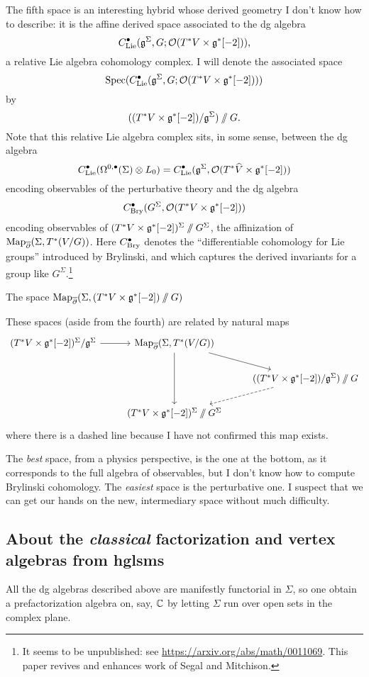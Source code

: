 \documentclass[11pt]{amsart}
\newcommand{\clie}{C^\bu_{\rm Lie}}
\newcommand{\cbry}{C^\bu_{\rm Bry}}
\begin{document}
The fifth space is an interesting hybrid whose derived geometry I don't know how to describe:
it is the affine derived space associated to the dg algebra
\[
\clie(\fg^\Sigma, G; \cO(T^* V \times \fg^*[-2])),
\]
a relative Lie algebra cohomology complex. 
I will denote the associated space
\[
\Spec(\clie(\fg^\Sigma, G; \cO(T^* V \times \fg^*[-2])))
\]
by
\[
((T^* V \times \mathfrak g^*[-2])/\mathfrak g^\Sigma)\mathbin{/\mkern-6mu/} G.
\]
Note that this relative Lie algebra complex sits, in some sense, between the dg algebra
\[
\clie(\Omega^{0,\bu}(\Sigma) \otimes L_0) = \clie(\fg^\Sigma, \cO(T^*\widehat{V} \times \fg^*[-2]))
\]
encoding observables of the perturbative theory
and the dg algebra
\[
\cbry(G^\Sigma, \cO(T^* V \times \fg^*[-2]))
\]
encoding observables of $(T^*V \times \mathfrak g^*[-2])^\Sigma \mathbin{/\mkern-6mu/} G^\Sigma$,
the affinization of~${\rm Map}_{\overline{\partial}}(\Sigma, T^*(V/G))$.
Here $\cbry$ denotes the ``differentiable cohomology for Lie groups'' introduced by Brylinski, 
and which captures the derived invariants for a group like $G^\Sigma$.\footnote{It seems to be unpublished: see \url{https://arxiv.org/abs/math/0011069}. This paper revives and enhances work of Segal and Mitchison.}

The space ${\rm Map}_{\overline{\partial}}(\Sigma,(T^*V \times \mathfrak g^*[-2])\mathbin{/\mkern-6mu/} G)$ 

These spaces (aside from the fourth) are related by natural maps
\[
\begin{tikzcd}
(T^* V \times \fg^*[-2])^\Sigma/\fg^\Sigma \arrow[r] & \Map_{\dbar}(\Sigma, T^*(V/G)) \arrow[dd] \arrow[dr]& \\
&&  ((T^* V \times \fg^*[-2])/\fg^\Sigma)\sslash G \arrow[dl, dashed] \\
&(T^*V \times \fg^*[-2])^\Sigma \sslash G^\Sigma&
\end{tikzcd}
\]
where there is a dashed line because I have not confirmed this map exists.

The {\em best} space, from a physics perspective, is the one at the bottom,
as it corresponds to the full algebra of observables,
but I don't know how to compute Brylinski cohomology.
The {\em easiest} space is the perturbative one.
I suspect that we can get our hands on the new, intermediary space without much difficulty.

\subsection{About the {\it classical} factorization and vertex algebras from hglsms}

All the dg algebras described above are manifestly functorial in $\Sigma$, 
so one obtain a prefactorization algebra on, say, $\mathbb C$ by letting $\Sigma$ run over open sets in the complex plane.
\end{document}
